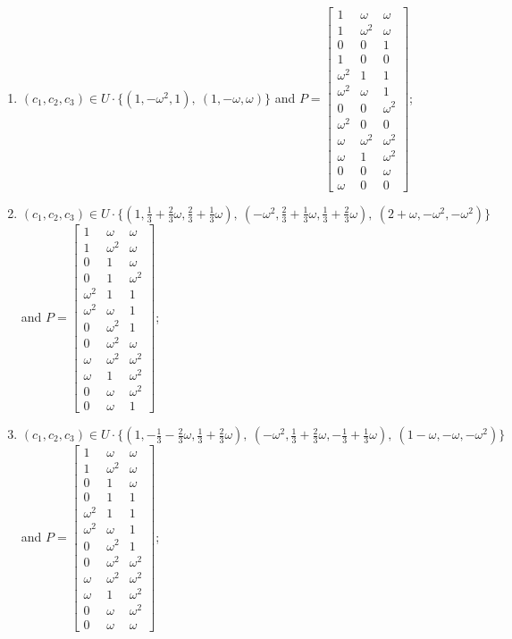 \begin{enumerate}
\item[(f59)\,\newitem] $(c_1,c_2,c_3)\in U\cdot\{(1,-\omega^2,1),\allowbreak\ (1,-\omega,\omega)\}$ and $P=\begin{bmatrix}1&\omega&\omega\\1&\omega^2&\omega\\0&0&1\\1&0&0\\\omega^2&1&1\\\omega^2&\omega&1\\0&0&\omega^2\\\omega^2&0&0\\\omega&\omega^2&\omega^2\\\omega&1&\omega^2\\0&0&\omega\\\omega&0&0\end{bmatrix}$;
\item[(f60)\,\newitem] $(c_1,c_2,c_3)\in U\cdot\{(1,\tfrac{1}{3}+\tfrac{2}{3}\omega,\tfrac{2}{3}+\tfrac{1}{3}\omega),\allowbreak\ (-\omega^2,\tfrac{2}{3}+\tfrac{1}{3}\omega,\tfrac{1}{3}+\tfrac{2}{3}\omega),\allowbreak\ (2+\omega,-\omega^2,-\omega^2)\}$ and $P=\begin{bmatrix}1&\omega&\omega\\1&\omega^2&\omega\\0&1&\omega\\0&1&\omega^2\\\omega^2&1&1\\\omega^2&\omega&1\\0&\omega^2&1\\0&\omega^2&\omega\\\omega&\omega^2&\omega^2\\\omega&1&\omega^2\\0&\omega&\omega^2\\0&\omega&1\end{bmatrix}$;
\item[(f61)\,\newitem] $(c_1,c_2,c_3)\in U\cdot\{(1,-\tfrac{1}{3}-\tfrac{2}{3}\omega,\tfrac{1}{3}+\tfrac{2}{3}\omega),\allowbreak\ (-\omega^2,\tfrac{1}{3}+\tfrac{2}{3}\omega,-\tfrac{1}{3}+\tfrac{1}{3}\omega),\allowbreak\ (1-\omega,-\omega,-\omega^2)\}$ and $P=\begin{bmatrix}1&\omega&\omega\\1&\omega^2&\omega\\0&1&\omega\\0&1&1\\\omega^2&1&1\\\omega^2&\omega&1\\0&\omega^2&1\\0&\omega^2&\omega^2\\\omega&\omega^2&\omega^2\\\omega&1&\omega^2\\0&\omega&\omega^2\\0&\omega&\omega\end{bmatrix}$;

\end{enumerate}
